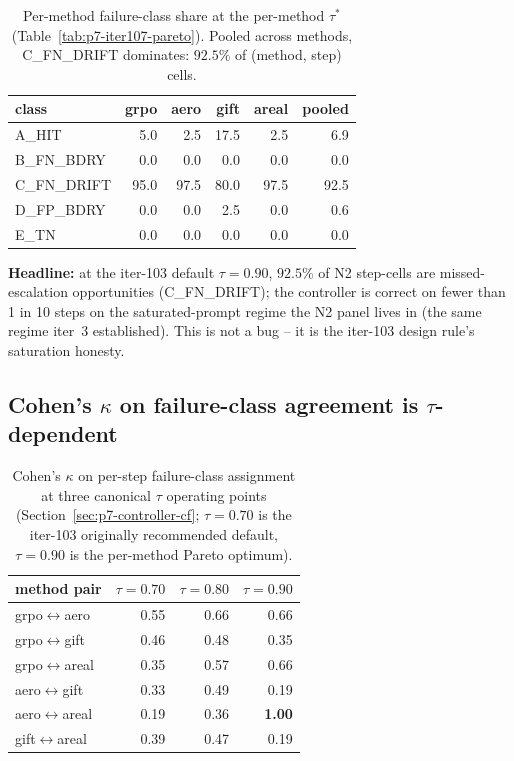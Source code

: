 \begin{table}[t]
\centering\small
\caption{Per-method failure-class share at the per-method $\tau^*$ (Table~\ref{tab:p7-iter107-pareto}).  Pooled across methods,
C\_FN\_DRIFT dominates: $92.5\%$ of (method, step) cells.}
\label{tab:p7-iter107-failshare}
\vspace{2pt}
\begin{tabular}{lrrrrr}
\toprule
class & grpo & aero & gift & areal & pooled \\
\midrule
A\_HIT       &  5.0 &  2.5 & 17.5 &  2.5 &  6.9 \\
B\_FN\_BDRY  &  0.0 &  0.0 &  0.0 &  0.0 &  0.0 \\
C\_FN\_DRIFT & 95.0 & 97.5 & 80.0 & 97.5 & 92.5 \\
D\_FP\_BDRY  &  0.0 &  0.0 &  2.5 &  0.0 &  0.6 \\
E\_TN        &  0.0 &  0.0 &  0.0 &  0.0 &  0.0 \\
\bottomrule
\end{tabular}
\end{table}

\textbf{Headline:} at the iter-103 default $\tau{=}0.90$, $92.5\%$ of N2
step-cells are missed-escalation opportunities (C\_FN\_DRIFT); the
controller is correct on fewer than 1 in 10 steps on the saturated-prompt
regime the N2 panel lives in (the same regime iter~3 established).  This is
not a bug -- it is the iter-103 design rule's saturation honesty.

\subsection{Cohen's $\kappa$ on failure-class agreement is $\tau$-dependent}

\begin{table}[t]
\centering\small
\caption{Cohen's $\kappa$ on per-step failure-class assignment at three
canonical $\tau$ operating points (Section~\ref{sec:p7-controller-cf};
$\tau{=}0.70$ is the iter-103 originally recommended default,
$\tau{=}0.90$ is the per-method Pareto optimum).}
\label{tab:p7-iter107-kappa}
\vspace{2pt}
\begin{tabular}{lrrr}
\toprule
method pair & $\tau{=}0.70$ & $\tau{=}0.80$ & $\tau{=}0.90$ \\
\midrule
grpo$\leftrightarrow$aero   &  0.55  &  0.66  &  0.66 \\
grpo$\leftrightarrow$gift   &  0.46  &  0.48  &  0.35 \\
grpo$\leftrightarrow$areal  &  0.35  &  0.57  &  0.66 \\
aero$\leftrightarrow$gift   &  0.33  &  0.49  &  0.19 \\
aero$\leftrightarrow$areal  &  0.19  &  0.36  &  \textbf{1.00} \\
gift$\leftrightarrow$areal  &  0.39  &  0.47  &  0.19 \\
\bottomrule
\end{tabular}
\end{table}

